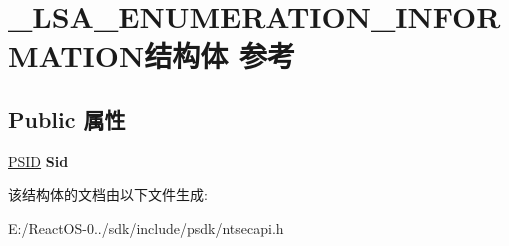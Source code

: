 \hypertarget{struct___l_s_a___e_n_u_m_e_r_a_t_i_o_n___i_n_f_o_r_m_a_t_i_o_n}{}\section{\+\_\+\+L\+S\+A\+\_\+\+E\+N\+U\+M\+E\+R\+A\+T\+I\+O\+N\+\_\+\+I\+N\+F\+O\+R\+M\+A\+T\+I\+O\+N结构体 参考}
\label{struct___l_s_a___e_n_u_m_e_r_a_t_i_o_n___i_n_f_o_r_m_a_t_i_o_n}
\subsection*{Public 属性}
\begin{DoxyCompactItemize}
\item 
\mbox{\label{struct___l_s_a___e_n_u_m_e_r_a_t_i_o_n___i_n_f_o_r_m_a_t_i_o_n_a3fb51ad3d70ba07b91c345254de7187e}} 
\hyperlink{struct___s_i_d}{P\+S\+ID} {\bfseries Sid}
\end{DoxyCompactItemize}


该结构体的文档由以下文件生成\+:\begin{DoxyCompactItemize}
\item 
E\+:/\+React\+O\+S-\/0../sdk/include/psdk/ntsecapi.\+h\end{DoxyCompactItemize}
